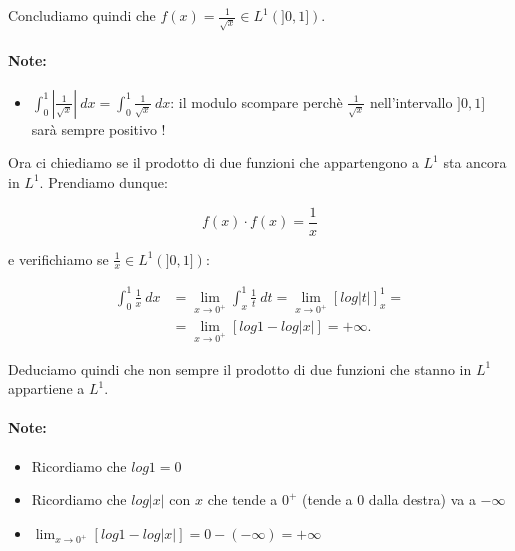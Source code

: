 Concludiamo quindi che $f(x) = \frac{1}{\sqrt{x}} \in L^1(]0, 1])$.

\paragraph{Note:}
\begin{itemize}
    \item $\int_{0}^{1} |\frac{1}{\sqrt{x}}| \ dx = \int_{0}^{1}
              \frac{1}{\sqrt{x}} \ dx$: il modulo scompare perchè
          $\frac{1}{\sqrt{x}}$ nell'intervallo $]0, 1]$ sarà sempre positivo
          !

\end{itemize}

\vspace{1cm}

Ora ci chiediamo se il prodotto di due funzioni che appartengono a $L^1$ sta
ancora in $L^1$. Prendiamo dunque:

$$
    f(x) \cdot f(x) = \frac{1}{x}
$$

e verifichiamo se $\frac{1}{x} \in L^1(]0, 1])$:

\begin{equation}
    \begin{aligned}
        \int_{0}^{1} \frac{1}{x} \ dx & = \lim_{x \rightarrow 0^+} \int_{x}^{1} \frac{1}{t} \ dt = \lim_{x \rightarrow 0^+} [log |t|]_{x}^{1} = \\
                                      & = \lim_{x \rightarrow 0^+} [log 1 - log|x|] = +\infty.
    \end{aligned}
\end{equation}

Deduciamo quindi che non sempre il prodotto di due funzioni che stanno in $L^1$
appartiene a $L^1$.

\paragraph{Note:}
\begin{itemize}
    \item Ricordiamo che $log 1 = 0$
    \item Ricordiamo che $log |x|$ con $x$ che tende a $0^+$ (tende a 0 dalla
          destra) va a $-\infty$

    \item $\lim_{x \rightarrow 0^+} [log 1 - log|x|] = 0 - (-\infty) = +\infty$
\end{itemize}

